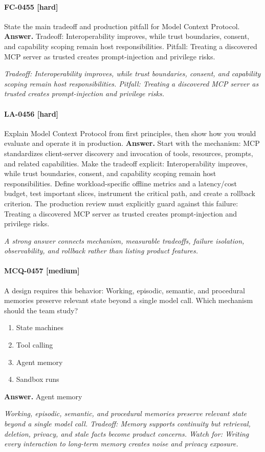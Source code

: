 \paragraph{FC-0455 [hard]} State the main tradeoff and production pitfall for Model Context Protocol.
\noindent\textbf{Answer.} Tradeoff: Interoperability improves, while trust boundaries, consent, and capability scoping remain host responsibilities. Pitfall: Treating a discovered MCP server as trusted creates prompt-injection and privilege risks.
\par\textit{Tradeoff: Interoperability improves, while trust boundaries, consent, and capability scoping remain host responsibilities. Pitfall: Treating a discovered MCP server as trusted creates prompt-injection and privilege risks.}
\paragraph{LA-0456 [hard]} Explain Model Context Protocol from first principles, then show how you would evaluate and operate it in production.
\noindent\textbf{Answer.} Start with the mechanism: MCP standardizes client-server discovery and invocation of tools, resources, prompts, and related capabilities. Make the tradeoff explicit: Interoperability improves, while trust boundaries, consent, and capability scoping remain host responsibilities. Define workload-specific offline metrics and a latency/cost budget, test important slices, instrument the critical path, and create a rollback criterion. The production review must explicitly guard against this failure: Treating a discovered MCP server as trusted creates prompt-injection and privilege risks.
\par\textit{A strong answer connects mechanism, measurable tradeoffs, failure isolation, observability, and rollback rather than listing product features.}
\paragraph{MCQ-0457 [medium]} A design requires this behavior: Working, episodic, semantic, and procedural memories preserve relevant state beyond a single model call. Which mechanism should the team study?
\begin{enumerate}[label=\Alph*.]
\item State machines
\item Tool calling
\item Agent memory
\item Sandbox runs
\end{enumerate}
\noindent\textbf{Answer.} Agent memory
\par\textit{Working, episodic, semantic, and procedural memories preserve relevant state beyond a single model call. Tradeoff: Memory supports continuity but retrieval, deletion, privacy, and stale facts become product concerns. Watch for: Writing every interaction to long-term memory creates noise and privacy exposure.}
